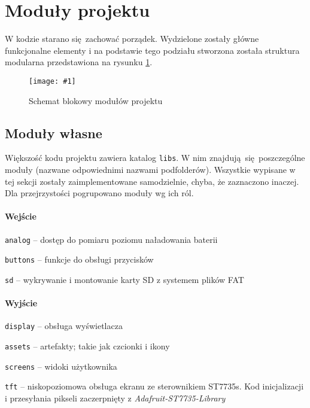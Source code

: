 \documentclass[12pt]{report}
\let\tempone\itemize
\let\temptwo\enditemize
\renewenvironment{itemize}{\tempone\setlength{\itemsep}{0cm}}{\temptwo}
\newcommand{\imgint}[4]{
	\begin{figure}[{#4}]
		\centering
		\texttt{[image: \#1]}
		\caption{#2}
		\label{#1}
	\end{figure}
}
\newcommand{\imgh}[3]{\imgint{#1}{#2}{#3}{H}}
\begin{document}
	\section{Moduły projektu}
	W kodzie starano się zachować porządek. Wydzielone zostały główne funkcjonalne elementy i na podstawie tego podziału stworzona została struktura modularna przedstawiona na rysunku \ref{3/pico-radio-code-block-diagram}.
	\imgh{3/pico-radio-code-block-diagram}{Schemat blokowy modułów projektu}{0.7}
	
	\subsection{Moduły własne}
	Większość kodu projektu zawiera katalog \lstinline|libs|. W nim znajdują się poszczególne moduły (nazwane odpowiednimi nazwami podfolderów). Wszystkie wypisane w tej sekcji zostały zaimplementowane samodzielnie, chyba, że zaznaczono inaczej. Dla przejrzystości pogrupowano moduły wg ich ról.
	
	\paragraph{Wejście}
	\begin{itemize}
		\item \lstinline|analog| -- dostęp do pomiaru poziomu naładowania baterii
		\item \lstinline|buttons| -- funkcje do obsługi przycisków
		\item \lstinline|sd| -- wykrywanie i montowanie karty SD z systemem plików FAT
	\end{itemize}

	\paragraph{Wyjście}
	\begin{itemize}
		\item \lstinline|display| -- obsługa wyświetlacza
		\begin{itemize}
			\item \lstinline|assets| -- artefakty; takie jak czcionki i ikony
			\item \lstinline|screens| -- widoki użytkownika
			\item \lstinline|tft| -- niskopoziomowa obsługa ekranu ze sterownikiem ST7735s. Kod inicjalizacji i przesyłania pikseli zaczerpnięty z \textit{Adafruit-ST7735-Library}\textsuperscript{\cite{adafruit_st7735}}
		\end{itemize}
	\end{itemize}
	
\end{document}
